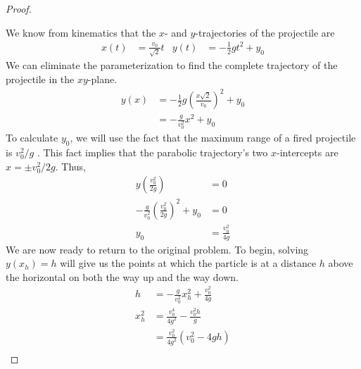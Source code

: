 \documentclass[../psets.tex]{subfiles}
\begin{document}
\begin{enumerate}
\begin{proof}
\begin{center}
        \end{center}
        We know from kinematics that the $x$- and $y$-trajectories of the projectile are
        \begin{align*}
            x(t) &= \frac{v_0}{\sqrt{2}}t&
            y(t) &= -\frac{1}{2}gt^2+y_0
        \end{align*}
        We can eliminate the parameterization to find the complete trajectory of the projectile in the $xy$-plane.
        \begin{align*}
            y(x) &= -\frac{1}{2}g\left( \frac{x\sqrt{2}}{v_0} \right)^2+y_0\\
            &= -\frac{g}{v_0^2}x^2+y_0
        \end{align*}
        To calculate $y_0$, we will use the fact that the maximum range of a fired projectile is $v_0^2/g$ \parencite[52]{bib:KibbleBerkshire}. This fact implies that the parabolic trajectory's two $x$-intercepts are $x=\pm v_0^2/2g$. Thus,
        \begin{align*}
            y\left( \frac{v_0^2}{2g} \right) &= 0\\
            -\frac{g}{v_0^2}\left( \frac{v_0^2}{2g} \right)^2+y_0 &= 0\\
            y_0 &= \frac{v_0^2}{4g}
        \end{align*}
        We are now ready to return to the original problem. To begin, solving $y(x_h)=h$ will give us the points at which the particle is at a distance $h$ above the horizontal on both the way up and the way down.
        \begin{align*}
            h &= -\frac{g}{v_0^2}x_h^2+\frac{v_0^2}{4g}\\
            x_h^2 &= \frac{v_0^4}{4g^2}-\frac{v_0^2h}{g}\\
            &= \frac{v_0^2}{4g^2}\left( v_0^2-4gh \right)\\

\end{align*}
\end{proof}
\end{enumerate}
\end{document}

